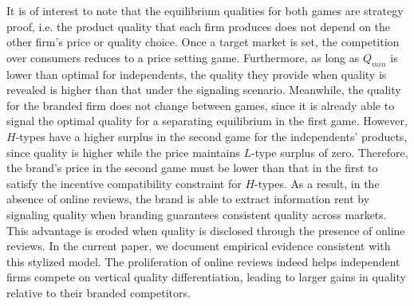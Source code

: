 \documentclass[mksc,blindrev]{informs3} %
\begin{document}

It is of interest to note that the equilibrium qualities for both games are strategy proof, i.e. the product quality that each firm produces does not depend on the other firm's price or quality choice. Once a target market is set, the competition over consumers reduces to a price setting game. Furthermore, as long as $Q_{min}$ is lower than optimal for independents, the quality they provide when quality is revealed is higher than that under the signaling scenario. Meanwhile, the quality for the branded firm does not change between games, since it is already able to signal the optimal quality for a separating equilibrium in the first game. However, $H$-types have a higher surplus in the second game for the independents' products, since quality is higher while the price maintains $L$-type surplus of zero. Therefore, the brand's price in the second game must be lower than that in the first to satisfy the incentive compatibility constraint for $H$-types. As a result, in the absence of online reviews, the brand is able to extract information rent by signaling quality when branding guarantees consistent quality across markets. This advantage is eroded when quality is disclosed through the presence of online reviews. In the current paper, we document empirical evidence consistent with this stylized model. The proliferation of online reviews indeed helps independent firms compete on vertical quality differentiation, leading to larger gains in quality relative to their branded competitors.
\end{document}
